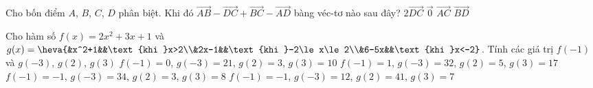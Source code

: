 \begin{ex}%
	Cho bốn điểm $A$, $B$, $C$, $D$ phân biệt. Khi đó $\overrightarrow{AB}-\overrightarrow{DC}+\overrightarrow{BC}-\overrightarrow{AD}$ bàng véc-tơ nào sau đây?
	\choice
	{$2\overrightarrow{DC}$}
	{\True $\overrightarrow{0}$}
	{$\overrightarrow{AC}$}
	{$\overrightarrow{BD}$}
\end{ex}
\begin{ex}%
	Cho hàm số $f(x)=2x^2+3x+1$ và $g(x)=\heva{&x^2+1&&\text{khi }x>2\\&2x-1&&\text{khi }-2\le x\le 2\\&6-5x&&\text{khi }x<-2}$. Tính các giá trị $f(-1)$ và $g(-3)$, $g(2)$, $g(3)$ 
	\choice
	{\True $f(-1)=0$, $g(-3)=21$, $g(2)=3$, $g(3)=10$}
	{$f(-1)=1$, $g(-3)=32$, $g(2)=5$, $g(3)=17$}
	{$f(-1)=-1$, $g(-3)=34$, $g(2)=3$, $g(3)=8$}
	{$f(-1)=-1$, $g(-3)=12$, $g(2)=41$, $g(3)=7$}
\end{ex}
